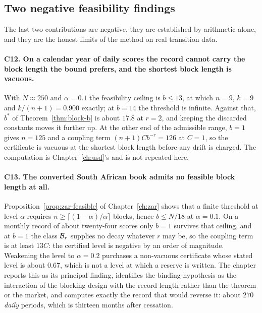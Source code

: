 \documentclass[../../../main.tex]{subfiles}
\begin{document}
\subsection{Two negative feasibility findings}

The last two contributions are negative, they are established by arithmetic alone, and they are the honest limits of the method on real transition data.

\paragraph{C12. On a calendar year of daily scores the record cannot carry the block length the bound prefers, and the shortest block length is vacuous.} With $N\approx250$ and $\alpha=0.1$ the feasibility ceiling is $b\le13$, at which $n=9$, $k=9$ and $k/(n+1)=0.900$ exactly; at $b=14$ the threshold is infinite. Against that, $b^*$ of Theorem~\ref{thm:block-b} is about $17.8$ at $r=2$, and keeping the discarded constants moves it further up. At the other end of the admissible range, $b=1$ gives $n=125$ and a coupling term $(n+1)Cb^{-r}=126$ at $C=1$, so the certificate is vacuous at the shortest block length before any drift is charged. The computation is Chapter~\ref{ch:usd}'s and is not repeated here.

\paragraph{C13. The converted South African book admits no feasible block length at all.} Proposition~\ref{prop:zar-feasible} of Chapter~\ref{ch:zar} shows that a finite threshold at level $\alpha$ requires $n\ge\lceil(1-\alpha)/\alpha\rceil$ blocks, hence $b\le N/18$ at $\alpha=0.1$. On a monthly record of about twenty-four scores only $b=1$ survives that ceiling, and at $b=1$ the class $\mathcal B_{r}$ supplies no decay whatever $r$ may be, so the coupling term is at least $13C$: the certified level is negative by an order of magnitude. Weakening the level to $\alpha=0.2$ purchases a non-vacuous certificate whose stated level is about $0.67$, which is not a level at which a reserve is written. The chapter reports this as its principal finding, identifies the binding hypothesis as the interaction of the blocking design with the record length rather than the theorem or the market, and computes exactly the record that would reverse it: about $270$ \emph{daily} periods, which is thirteen months after cessation.

\end{document}
